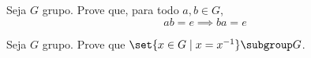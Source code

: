 \begin{exercise}
    Seja $G$ grupo. Prove que, para todo $a,b \in G$, $$ab = e \implies ba = e$$
\end{exercise}

\begin{exercise}
    Seja $G$ grupo. Prove que $\set{x \in G \mid x = x^{-1}} \subgroup G$.
\end{exercise}